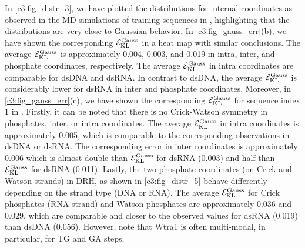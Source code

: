 In \cref{c3:fig_distr_3}, we have plotted the distributions for internal coordinates as observed in the MD simulations of training sequences in \Lbrna, highlighting that the distributions are very close to Gaussian behavior. 
In \cref{c3:fig_gauss_err}(b), we have shown the corresponding ${\mathcal E}_{\text{KL}}^{\text{Gauss}}$ in a heat map with similar conclusions. 
The average ${\mathcal E}_{\text{KL}}^{\text{Gauss}}$ is approximately 0.004, 0.003, and 0.019 in intra, inter, and phosphate coordinates, respectively.
The average ${\mathcal E}_{\text{KL}}^{\text{Gauss}}$ in intra coordinates are comparable for dsDNA and dsRNA. 
In contrast to dsDNA, the average ${\mathcal E}_{\text{KL}}^{\text{Gauss}}$ is considerably lower for dsRNA in inter and phosphate coordinates. 
Moreover, in \cref{c3:fig_gauss_err}(c), we have shown the corresponding ${\mathcal E}_{\text{KL}}^{\text{Gauss}}$ for sequence index 1 in \Lbdrh. 
Firstly, it can be noted that there is no Crick-Watson symmetry in phosphates, inter, or intra coordinates.
The average ${\mathcal E}_{\text{KL}}^{\text{Gauss}}$ in intra coordinates is approximately 0.005, which is comparable to the corresponding observations in dsDNA or dsRNA.
The corresponding error in inter coordinates is approximately 0.006 which is almost double than ${\mathcal E}_{\text{KL}}^{\text{Gauss}}$ for dsRNA (0.003) and half than ${\mathcal E}_{\text{KL}}^{\text{Gauss}}$ for dsRNA (0.011).
Lastly, the two phosphate coordinates (on Crick and Watson strands) in DRH, as shown in \cref{c3:fig_distr_5} behave differently depending on the strand type (DNA or RNA).
The average ${\mathcal E}_{\text{KL}}^{\text{Gauss}}$ for Crick phosphates (RNA strand) and Watson phosphates are approximately 0.036 and 0.029, which are comparable and closer to the observed values for dsRNA (0.019) than dsDNA (0.056).
However, note that Wtra1 is often multi-modal, in particular, for TG and GA steps. 

